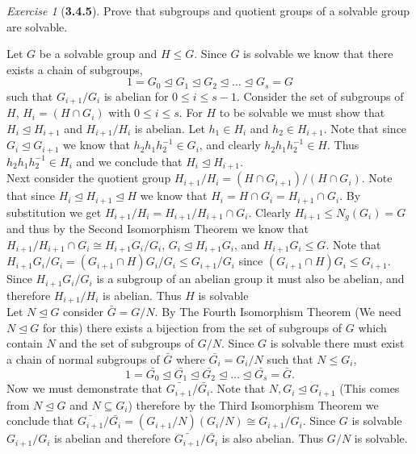 \documentclass[12pt]{amsart}
\makeatletter
\theoremstyle{remark}
\newtheorem*{exercise}{Exercise}%
\renewenvironment{proof}[1][\proofname]{\par\doublespacing
  \pushQED{\qed}%
  \normalfont \topsep6\p@\@plus6\p@\relax
  \list{}{%
    \settowidth{\leftmargin}{\itshape\proofname:\hskip\labelsep}%
    \setlength{\labelwidth}{0pt}%
    \setlength{\itemindent}{-\leftmargin}%
  }%
  \item[\hskip\labelsep\itshape#1\@addpunct{:}]\ignorespaces
}{%
  \popQED\endlist\@endpefalse
  \singlespacing
}
\theoremstyle{mycomment}
\makeatother
\begin{document}
\begin{exercise}[\textbf{3.4.5}] Prove that subgroups and quotient groups of a solvable group are solvable. 
  \begin{proof} Let $G$ be a solvable group and $H \leq G$. Since $G$ is solvable we know that there exists 
    a chain of subgroups, 
    \begin{equation*}
      1 = G_0 \trianglelefteq G_1 \trianglelefteq G_2 \trianglelefteq \dots \trianglelefteq G_s = G
    \end{equation*}
    such that $G_{i + 1}/G_i$ is abelian for $0 \leq i \leq s - 1$. Consider the set of subgroups of $H$, $H_i = (H \cap G_i)$
    with $0 \leq i \leq s$. For $H$ to be solvable we must show that $H_i \trianglelefteq H_{i + 1}$ and $H_{i + 1}/H_i$ is abelian.
    Let $h_1 \in H_i$ and $h_2 \in H_{i+1}$. Note that since $G_i \trianglelefteq G_{i + 1}$ we know that $h_2h_1h_2^{-1} \in G_i$, and clearly 
    $h_2h_1h_2^{-1} \in H$. Thus $h_2h_1h_2^{-1} \in H_i$ and we conclude that $H_i \trianglelefteq H_{i + 1}$.\\
    Next consider the quotient group $H_{i + 1}/H_i = (H \cap G_{i + 1})/(H \cap G_{i})$. Note that since $H_i \trianglelefteq H_{i + 1} \trianglelefteq H$ we know that $H_i = H \cap G_{i} = H_{i + 1} \cap G_{i}$. By substitution we get $H_{i + 1}/H_i = H_{i + 1}/H_{i + 1} \cap G_{i}$. Clearly $H_{i + 1} \leq N_g(G_i) = G$ and thus by the Second Isomorphism Theorem we know that $H_{i + 1}/H_{i + 1} \cap G_{i} \cong H_{i + 1}G_i/G_i$, $G_i \trianglelefteq H_{i + 1}G_i$, and $H_{i + 1}G_i \leq G$.
    Note that $H_{i + 1}G_i/G_i = (G_{i + 1}\cap H)G_i/G_i \leq G_{i + 1}/G_i$ since $(G_{i + 1}\cap H)G_i \leq G_{i + 1}$. Since $H_{i + 1}G_i/G_i$ is a subgroup of an abelian group it must also be abelian, and therefore $H_{i + 1}/H_i$ is abelian. Thus $H$ is solvable\\

    Let $N \trianglelefteq G$ consider $\bar{G} = G/N$. By The Fourth Isomorphism Theorem (We need $N \trianglelefteq G$ for this) there exists a bijection from 
    the set of subgroups of $G$ which contain $N$ and the set of subgroups of $G/N$. Since $G$ is solvable there must exist a chain of normal subgroups of $\bar{G}$ where $\bar{G_i} = G_i/N$ such that $N \leq G_i$, 
    \begin{equation*}
      1 = \bar{G_0} \trianglelefteq \bar{G_1} \trianglelefteq \bar{G_2} \trianglelefteq \dots \trianglelefteq \bar{G_s} = \bar{G}. 
    \end{equation*}
    Now we must demonstrate that $\bar{G_{i + 1}}/\bar{G_{i}}$. Note that $N, G_i \trianglelefteq G_{i + 1}$ (This comes from $N \trianglelefteq G$ and $N \subseteq G_i$) therefore by the Third Isomorphism Theorem we 
    conclude that $\bar{G_{i + 1}}/\bar{G_{i}} = (G_{i + 1}/N)(G_{i}/N) \cong G_{i + 1}/G_{i}$. Since $G$ is solvable $G_{i + 1}/G_{i}$ is abelian and therefore 
    $\bar{G_{i + 1}}/\bar{G_{i}}$ is also abelian. Thus $G/N$ is solvable.
  \end{proof}
\end{exercise}
\vspace{.15in}
\end{document}
